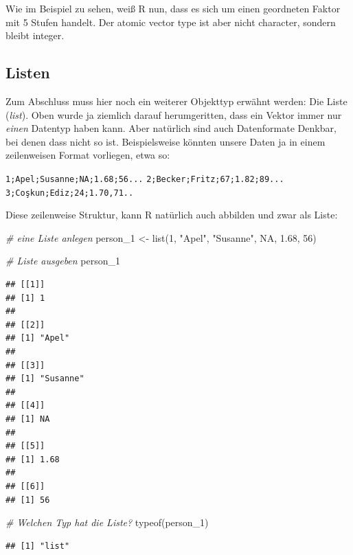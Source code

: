 \documentclass[
]{book}
\newenvironment{Shaded}{\begin{snugshade}}{\end{snugshade}}
\newcommand{\CommentTok}[1]{\textcolor[rgb]{0.56,0.35,0.01}{\textit{#1}}}
\newcommand{\ConstantTok}[1]{\textcolor[rgb]{0.00,0.00,0.00}{#1}}
\newcommand{\DecValTok}[1]{\textcolor[rgb]{0.00,0.00,0.81}{#1}}
\newcommand{\FloatTok}[1]{\textcolor[rgb]{0.00,0.00,0.81}{#1}}
\newcommand{\FunctionTok}[1]{\textcolor[rgb]{0.00,0.00,0.00}{#1}}
\newcommand{\NormalTok}[1]{#1}
\newcommand{\OtherTok}[1]{\textcolor[rgb]{0.56,0.35,0.01}{#1}}
\newcommand{\StringTok}[1]{\textcolor[rgb]{0.31,0.60,0.02}{#1}}
\begin{document}
Wie im Beispiel zu sehen, weiß R nun, dass es sich um einen geordneten Faktor mit 5 Stufen handelt. Der atomic vector type ist aber nicht character, sondern bleibt integer.

\hypertarget{listen}{%
\subsection{Listen}\label{listen}}

Zum Abschluss muss hier noch ein weiterer Objekttyp erwähnt werden: Die Liste (\emph{list}). Oben wurde ja ziemlich darauf herumgeritten, dass ein Vektor immer nur \emph{einen} Datentyp haben kann. Aber natürlich sind auch Datenformate Denkbar, bei denen dass nicht so ist. Beispielsweise könnten unsere Daten ja in einem zeilenweisen Format vorliegen, etwa so:

\texttt{1;Apel;Susanne;NA;1.68;56...}
\texttt{2;Becker;Fritz;67;1.82;89...}
\texttt{3;Coşkun;Ediz;24;1.70,71..}

Diese zeilenweise Struktur, kann R natürlich auch abbilden und zwar als Liste:

\begin{Shaded}
\begin{Highlighting}[]
\CommentTok{\# eine Liste anlegen}
\NormalTok{person\_1 }\OtherTok{\textless{}{-}} \FunctionTok{list}\NormalTok{(}\DecValTok{1}\NormalTok{, }\StringTok{"Apel"}\NormalTok{, }\StringTok{"Susanne"}\NormalTok{, }\ConstantTok{NA}\NormalTok{, }\FloatTok{1.68}\NormalTok{, }\DecValTok{56}\NormalTok{)}

\CommentTok{\# Liste ausgeben}
\NormalTok{person\_1}
\end{Highlighting}
\end{Shaded}

\begin{verbatim}
## [[1]]
## [1] 1
## 
## [[2]]
## [1] "Apel"
## 
## [[3]]
## [1] "Susanne"
## 
## [[4]]
## [1] NA
## 
## [[5]]
## [1] 1.68
## 
## [[6]]
## [1] 56
\end{verbatim}

\begin{Shaded}
\begin{Highlighting}[]
\CommentTok{\# Welchen Typ hat die Liste?}
\FunctionTok{typeof}\NormalTok{(person\_1)}
\end{Highlighting}
\end{Shaded}

\begin{verbatim}
## [1] "list"
\end{verbatim}
\end{document}

